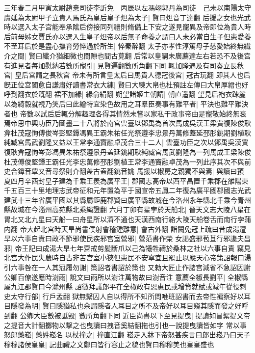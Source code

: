 三年春二月甲寅太尉趙憙司徒李訢免　丙辰以左馮翊郭丹為司徒　己未以南陽太守虞延為太尉甲子立貴人馬氏為皇后皇子炟為太子|{
	賢曰炟音丁達翻}
后援之女也光武時以選入太子宫能奉承隂后傍接同列禮則脩備上下安之遂見寵異及帝即位為貴人時后前母姊女賈氏亦以選入生皇子炟帝以后無子命養之謂曰人未必當自生子但患愛養不至耳后於是盡心撫育勞悴過於所生|{
	悴秦醉翻}
太子亦孝性淳篤母子慈愛始終無纎介之間|{
	賢曰纎介猶細微也間隙也間古莧翻}
后常以皇嗣未廣薦達左右若恐不及後宫有進見者每加慰納若數所寵引|{
	見賢遍翻數所角翻下同}
輒加隆遇及有司奏立長秋宫|{
	皇后宫謂之長秋宫}
帝未有所言皇太后曰馬貴人德冠後宫|{
	冠古玩翻}
即其人也后旣正位宫闈愈自謙肅好讀書常衣大練|{
	賢曰大練大帛也杜預註左傳曰大帛厚繒也好呼到翻衣於旣翻}
裙不加緣|{
	緣俞絹翻}
朔望諸姬主朝請|{
	朝直遥翻}
望見后袍衣踈麄以為綺縠就視乃笑后曰此繒特宜染色故用之耳羣臣奏事有難平者|{
	平決也難平難決者也}
帝數以試后后輒分解趣理各得其情然未嘗以家私干政事帝由是寵敬始終無衰焉帝思中興功臣乃圖畫二十八將於南宫雲臺以鄧禹為首次馬成吳漢王梁賈復陳俊耿弇杜茂寇恂傅俊岑彭堅鐔馮異王霸朱祐任光祭遵李忠景丹萬修蓋延邳肜銚期劉植耿純臧宫馬武劉隆又益以王常李通竇融卓茂合三十二人|{
	雲臺功臣之次以鄧禹吳漢賈復耿弇寇恂岑彭馮異朱祐祭遵景丹盖延銚期耿純臧宫馬武劉隆為一列馬成王梁陳俊杜茂傅俊堅鐔王霸任光李忠萬修邳肜劉植王常李通竇融卓茂為一列此序其次不與前史合鐔音覃又音尋祭則介翻盖古盍翻銚音姚}
馬援以椒房之親獨不與焉|{
	與讀曰預}
夏四月辛酉封皇子建為千乘王羨為廣平王|{
	郡國志高帝以西平昌置千乘郡在雒陽東千五百三十里地理志武帝征和元年置為平于國宣帝五鳳二年復為廣平國郡國志光武建武十三年省廣平國以其縣屬鉅鹿郡賢曰廣平縣故城在今洛州永年縣北千乘今青州縣故城在今淄州高苑縣北乘䋲證翻}
六月丁卯有星孛於天船北|{
	晉天文志大陵八星在胃北又北九星曰天船一曰舟星所以濟不通也天漢西南行絡大陵天船卷舌而南行孛蒲内翻}
帝大起北宫時天旱尚書僕射會稽鍾離意|{
	會古外翻}
詣闕免冠上疏曰昔成湯遭旱以六事自責曰政不節邪使民疾邪宫室營邪|{
	營范書作榮}
女謁盛邪苞苴行邪讒夫昌邪|{
	帝王記曰成湯大旱七年齋戒剪髪斷爪以己為犧牲禱於桑林之社以六事自責}
竊見北宫大作民失農時自古非苦宫室小狹但患民不安寧宜且罷止以應天心帝策詔報曰湯引六事咎在一人其冠履勿謝|{
	策詔者書詔於策也}
又勑大匠止作諸宫減省不急詔因謝公卿百僚遂應時澍雨|{
	說文曰雨所以澍注萬物故曰澍音注}
意薦全椒長劉平|{
	全椒縣屬九江郡賢曰今滁州縣}
詔徵拜議郎平在全椒政有恩惠民或增貲就賦或減年從役刺史太守行部|{
	行戶孟翻}
獄無繋囚人自以得所不知所問唯班詔書而去帝性褊察好以耳目隱發為明|{
	賢曰隱猶私也余謂隱者人耳目之所不及帝好以耳目窺其隱而發之好呼到翻}
公卿大臣數被詆毁|{
	數所角翻下同}
近臣尚書以下至見提曳|{
	提讀如冒絮提文帝之提音大計翻擲物以撃之也曳讀曰拽音奚結翻拖也引也一說提曳讀皆如字}
常以事怒郎藥崧|{
	藥姓崧名}
以杖撞之|{
	撞直江翻}
崧走入牀下帝怒甚疾言曰郎出崧乃曰天子穆穆諸侯皇皇|{
	記曲禮之文鄭曰皆行容止之貌也賢曰穆穆美也皇皇盛也}
